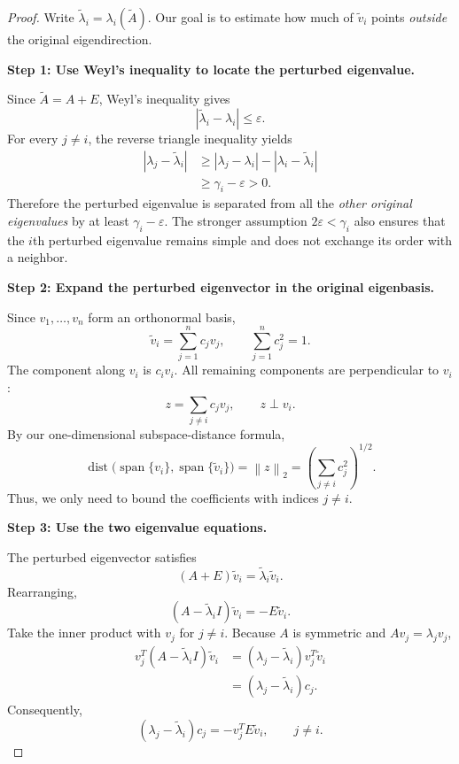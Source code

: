 \documentclass[14pt,letterpaper]{article}
\theoremstyle{plain}
\theoremstyle{definition}
\theoremstyle{remark}
\newcommand{\norm}[1]{\left\lVert #1 \right\rVert}
\DeclareMathOperator{\Span}{span}
\DeclareMathOperator{\dist}{dist}
\begin{document}
\begin{proof}
Write $\widetilde\lambda_i=\lambda_i(\widetilde A)$.
Our goal is to estimate how much of $\widetilde v_i$
points \emph{outside} the original eigendirection.

\medskip
\noindent\textbf{Step 1: Use Weyl's inequality to locate the perturbed eigenvalue.}

Since $\widetilde A=A+E$, Weyl's inequality gives
\[
\boxed{
|\widetilde\lambda_i-\lambda_i|\leq\varepsilon.
}
\]
For every $j\neq i$, the reverse triangle inequality yields
\[
\begin{aligned}
|\lambda_j-\widetilde\lambda_i|
&\geq|\lambda_j-\lambda_i|
   -|\lambda_i-\widetilde\lambda_i|\\
&\geq\gamma_i-\varepsilon>0.
\end{aligned}
\]
Therefore the perturbed eigenvalue is separated from
all the \emph{other original eigenvalues} by at least
$\gamma_i-\varepsilon$.
The stronger assumption $2\varepsilon<\gamma_i$
also ensures that the $i$th perturbed eigenvalue remains
simple and does not exchange its order with a neighbor.

\medskip
\noindent\textbf{Step 2: Expand the perturbed eigenvector in the original eigenbasis.}

Since $v_1,\ldots,v_n$ form an orthonormal basis,
\[
\boxed{
\widetilde v_i=\sum_{j=1}^n c_jv_j,
\qquad \sum_{j=1}^n c_j^2=1.
}
\]
The component along $v_i$ is $c_i v_i$.
All remaining components are perpendicular to $v_i$:
\[
z=\sum_{j\neq i}c_jv_j,
\qquad z\perp v_i.
\]
By our one-dimensional subspace-distance formula,
\[
\boxed{
\dist\bigl(\Span\{v_i\},\Span\{\widetilde v_i\}\bigr)
=\norm{z}_2
=\left(\sum_{j\neq i}c_j^2\right)^{1/2}.
}
\]
Thus, we only need to bound the coefficients with
indices $j\neq i$.

\medskip
\noindent\textbf{Step 3: Use the two eigenvalue equations.}

The perturbed eigenvector satisfies
\[
(A+E)\widetilde v_i
=\widetilde\lambda_i\widetilde v_i.
\]
Rearranging,
\[
\boxed{
(A-\widetilde\lambda_i I)\widetilde v_i
=-E\widetilde v_i.
}
\]
Take the inner product with $v_j$ for $j\neq i$.
Because $A$ is symmetric and $Av_j=\lambda_jv_j$,
\[
\begin{aligned}
v_j^T(A-\widetilde\lambda_i I)\widetilde v_i
&=(\lambda_j-\widetilde\lambda_i)
  v_j^T\widetilde v_i\\
&=(\lambda_j-\widetilde\lambda_i)c_j.
\end{aligned}
\]
Consequently,
\[
\boxed{
(\lambda_j-\widetilde\lambda_i)c_j
=-v_j^TE\widetilde v_i,
\qquad j\neq i.
}
\]


\end{proof}
\end{document}
